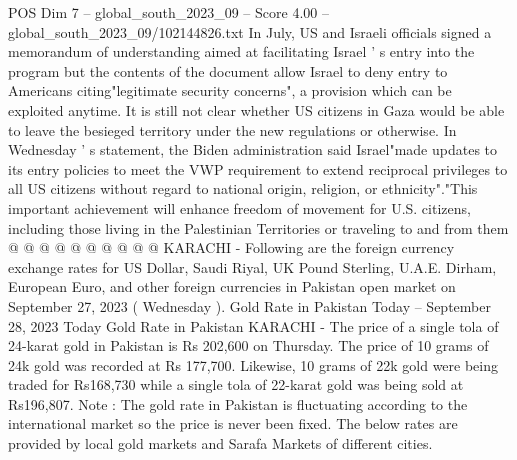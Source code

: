 \begin{textsample}{POS Dim 7 – global\_south\_2023\_09 – Score 4.00 – global\_south\_2023\_09/102144826.txt}
In July, US and Israeli officials signed a memorandum of understanding aimed at facilitating Israel ' s entry into the program but the contents of the document allow Israel to deny entry to Americans citing"legitimate security concerns", a provision which can be exploited anytime.
It is still not clear whether US citizens in Gaza would be able to leave the besieged territory under the new regulations or otherwise.
In Wednesday ' s statement, the Biden administration said Israel"made updates to its entry policies to meet the VWP requirement to extend reciprocal privileges to all US citizens without regard to national origin, religion, or ethnicity"."This important achievement will enhance freedom of movement for U.S. citizens, including those living in the Palestinian Territories or traveling to and from them @ @ @ @ @ @ @ @ @ @ KARACHI - Following are the foreign currency exchange rates for US Dollar, Saudi Riyal, UK Pound Sterling, U.A.E.
Dirham, European Euro, and other foreign currencies in Pakistan open market on September 27, 2023 ( Wednesday ).
Gold Rate in Pakistan Today -- September 28, 2023 Today Gold Rate in Pakistan KARACHI - The price of a single tola of 24-karat gold in Pakistan is Rs 202,600 on Thursday.
The price of 10 grams of 24k gold was recorded at Rs 177,700.
Likewise, 10 grams of 22k gold were being traded for Rs168,730 while a single tola of 22-karat gold was being sold at Rs196,807.
Note : The gold rate in Pakistan is fluctuating according to the international market so the price is never been fixed.
The below rates are provided by local gold markets and Sarafa Markets of different cities.

\end{textsample}
